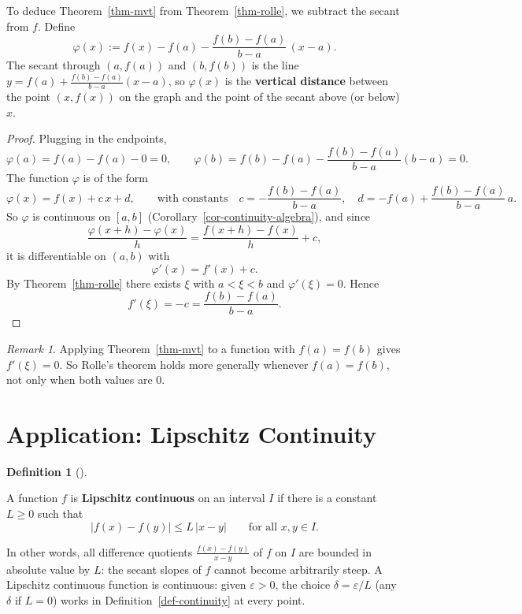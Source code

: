\documentclass[
  letterpaper,
  DIV=11,
  numbers=noendperiod]{scrreprt}
\theoremstyle{plain}
\theoremstyle{plain}
\theoremstyle{definition}
\newtheorem{definition}{Definition}[chapter]
\theoremstyle{definition}
\theoremstyle{definition}
\theoremstyle{plain}
\theoremstyle{plain}
\theoremstyle{remark}
\newtheorem{refremark}{Remark}[chapter]
\begin{document}
To deduce Theorem~\ref{thm-mvt} from Theorem~\ref{thm-rolle}, we
subtract the secant from \(f\). Define \[
\varphi(x) := f(x) - f(a) - \frac{f(b)-f(a)}{b-a}\,(x-a).
\] The secant through \((a,f(a))\) and \((b,f(b))\) is the line
\(y = f(a) + \frac{f(b)-f(a)}{b-a}(x-a)\), so \(\varphi(x)\) is the
\textbf{vertical distance} between the point \((x,f(x))\) on the graph
and the point of the secant above (or below) \(x\).

\begin{proof}
Plugging in the endpoints, \[
\varphi(a) = f(a) - f(a) - 0 = 0,
\qquad
\varphi(b) = f(b) - f(a) - \frac{f(b)-f(a)}{b-a}(b-a) = 0 .
\] The function \(\varphi\) is of the form \[
\varphi(x) = f(x) + c\,x + d,
\qquad\text{with constants}\quad
c = -\frac{f(b)-f(a)}{b-a}, \quad d = -f(a) + \frac{f(b)-f(a)}{b-a}\,a .
\] So \(\varphi\) is continuous on \([a,b]\)
(Corollary~\ref{cor-continuity-algebra}), and since \[
\frac{\varphi(x+h)-\varphi(x)}{h} = \frac{f(x+h)-f(x)}{h} + c ,
\] it is differentiable on \((a,b)\) with \[
\varphi'(x) = f'(x) + c .
\] By Theorem~\ref{thm-rolle} there exists \(\xi\) with \(a<\xi<b\) and
\(\varphi'(\xi)=0\). Hence \[
f'(\xi) = -c = \frac{f(b)-f(a)}{b-a} .
\]
\end{proof}

\begin{refremark}
Applying Theorem~\ref{thm-mvt} to a function with \(f(a)=f(b)\) gives
\(f'(\xi)=0\). So Rolle's theorem holds more generally whenever
\(f(a)=f(b)\), not only when both values are \(0\).

\label{rem-rolle-general}

\end{refremark}

\section{Application: Lipschitz
Continuity}\label{application-lipschitz-continuity}

\begin{definition}[]\protect\hypertarget{def-lipschitz}{}\label{def-lipschitz}

\hfill\break
A function \(f\) is \textbf{Lipschitz continuous} on an interval \(I\)
if there is a constant \(L\ge0\) such that \[
\lvert f(x)-f(y) \rvert \le L\,\lvert x-y \rvert \qquad\text{for all } x,y\in I .
\]

\end{definition}

In other words, all difference quotients \(\frac{f(x)-f(y)}{x-y}\) of
\(f\) on \(I\) are bounded in absolute value by \(L\): the secant slopes
of \(f\) cannot become arbitrarily steep. A Lipschitz continuous
function is continuous: given \(\varepsilon>0\), the choice
\(\delta=\varepsilon/L\) (any \(\delta\) if \(L=0\)) works in
Definition~\ref{def-continuity} at every point.
\end{document}
